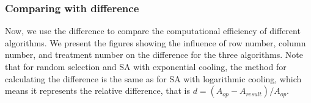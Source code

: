 \documentclass[
  a4paper,
  oneside,
  openany,
  12pt,
  onecolumn]{book}
\theoremstyle{plain}
\theoremstyle{definition}
\theoremstyle{remark}
\begin{document}
\subsubsection{Comparing with
difference}\label{comparing-with-difference}

Now, we use the difference to compare the computational efficiency of
different algorithms. We present the figures showing the influence of
row number, column number, and treatment number on the difference for
the three algorithms. Note that for random selection and SA with
exponential cooling, the method for calculating the difference is the
same as for SA with logarithmic cooling, which means it represents the
relative difference, that is \(d = (A_{op}-A_{result})/A_{op}\).

\begin{figure}


\caption{\label{fig-align}}

\end{figure}%
\end{document}
